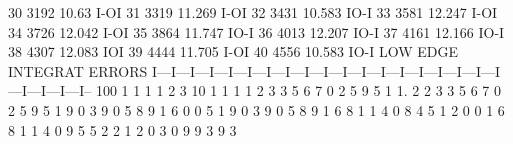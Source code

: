 \begin{Listing}
    30      3192        10.63                                                                      I-OI
    31      3319        11.269                                                                       I-OI
    32      3431        10.583                                                                     IO-I
    33      3581        12.247                                                                          I-OI
    34      3726        12.042                                                                         I-OI
    35      3864        11.747                                                                         IO-I
    36      4013        12.207                                                                          IO-I
    37      4161        12.166                                                                          IO-I
    38      4307        12.083                                                                          IOI
    39      4444        11.705                                                                        I-OI
    40      4556        10.583                                                                     IO-I
  LOW EDGE  INTEGRAT   ERRORS  I---I---I---I---I---I---I---I---I---I---I---I---I---I---I---I---I---I---I---I---I---I---I--
                         100                                                                       1   1   1   1   2   3
                          10                               1   1   1   1   2   3   3   5   6   7   0   2   5   9   5   1
                           1.  2   2   3   3   5   6   7   0   2   5   9   5   1   9   0   3   9   0   5   8   9   1   6
                           0   0   5   1   9   0   3   9   0   5   8   9   1   6   8   1   1   4   0   8   4   5   1   2
                           0   0   1   6   8   1   1   4   0   9   5   5   2   2   1   2   0   3   0   9   9   3   9   3
 

\end{Listing}
